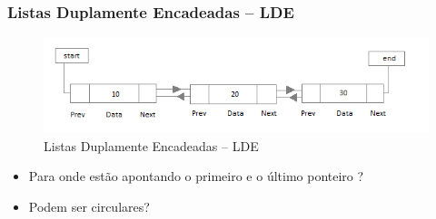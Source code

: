
\begin{frame}%

\frametitle{Listas Duplamente Encadeadas -- LDE}

\begin{figure}[!hb]
	\centering
\includegraphics[height=0.450\paperheight, width=0.8\paperwidth]{figs/fig_listas/lista_DE_01.png}						
			\caption{Listas Duplamente Encadeadas -- LDE}	
		\end{figure} 

\begin{itemize}
  \item Para onde estão apontando  o primeiro e o último  ponteiro ?
  \item Podem ser circulares?
\end{itemize}
\end{frame} 



